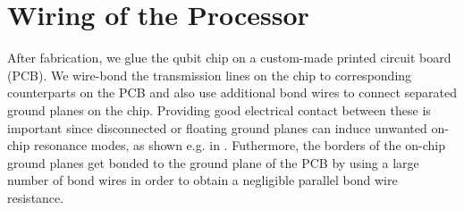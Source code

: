 \begin{enumerate}
\end{enumerate}

\section{Wiring of the Processor}

After fabrication, we glue the qubit chip on a custom-made printed circuit board (PCB). We wire-bond the transmission lines on the chip to corresponding counterparts on the PCB and also use additional bond wires to connect separated ground planes on the chip. Providing good electrical contact between these is important since disconnected or floating ground planes can induce unwanted on-chip resonance modes, as shown e.g. in \citep{schuster_circuit_2007}. Futhermore, the borders of the on-chip ground planes get bonded to the ground plane of the PCB by using a large number of bond wires in order to obtain a negligible parallel bond wire resistance.